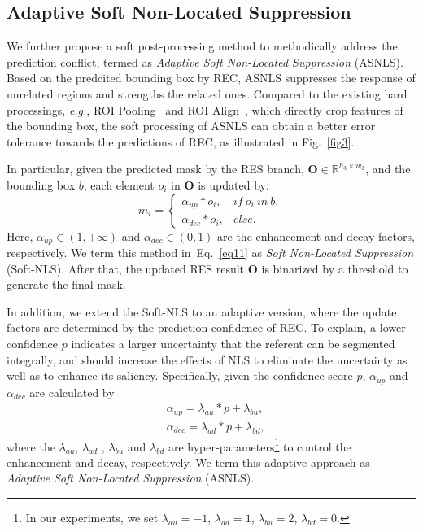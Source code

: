 \documentclass[10pt,twocolumn,letterpaper]{article}
\begin{document}
\subsection{Adaptive Soft Non-Located Suppression}
We further  propose a soft post-processing method to methodically  address the prediction conflict, termed as \emph{Adaptive Soft Non-Located Suppression} (ASNLS).
Based on the predcited bounding box by REC, ASNLS suppresses the response of unrelated regions and strengths the related ones. 
Compared to the existing hard processings, \emph{e.g.}, ROI Pooling~\cite{ren2017faster} and ROI Align~\cite{he2017mask}, which directly crop features of the  bounding box, the soft processing of ASNLS can obtain a better error tolerance towards the predictions of REC, as illustrated in Fig.~\ref{fig3}. 

In particular,  given the predicted mask by the RES branch, $\mathbf{O} \in \mathbb{R}^{h_3 \times w_3}$, and the bounding box $b$, each element $o_i$ in $\mathbf{O}$ is updated by:
\begin{equation}
m_i=\left\{\begin{matrix}
\alpha_{up} * o_i, & if~o_i~in~ b, \\ 
\alpha_{dec} * o_i, & else.
\end{matrix}\right.
\label{eq11}
\end{equation}
Here, $\alpha_{up} \in \left( 1,+\infty \right)$ and $\alpha_{dec} \in \left( 0,1 \right) $ are the enhancement and  decay factors, respectively. We term this method  in~Eq.~\ref{eq11} as \emph{Soft Non-Located Suppression} (Soft-NLS).   After that, the updated RES result  $\mathbf{O}$ is binarized by  a threshold to generate the final mask.

In addition, we extend the Soft-NLS to an adaptive version, where the update factors are determined by the prediction confidence of REC. To explain, a lower confidence $p$  indicates  a larger uncertainty that  the referent can be segmented integrally, and should increase the effects of NLS to eliminate the uncertainty as well as to enhance its saliency.  Specifically, given the confidence score $p$, $\alpha_{up}$ and $\alpha_{dec}$ are calculated by
\begin{equation}
\begin{aligned}
&\alpha_{up}=\lambda_{au}*p+\lambda_{bu},\\
&\alpha_{dec}=\lambda_{ad}*p+\lambda_{bd},
\end{aligned}
\label{eq10}
\end{equation}
where  the $\lambda_{au}$,  $\lambda_{ad}$ ,  $\lambda_{bu}$ and $\lambda_{bd}$  are hyper-parameters\footnote{In our experiments, we set $\lambda_{au}=-1$,  $\lambda_{ad}=1$,  $\lambda_{bu}=2$,  $\lambda_{bd}=0$.} to control  the  enhancement and decay, respectively. We term this adaptive approach as \emph{Adaptive Soft Non-Located Suppression} (ASNLS).   
\end{document}
